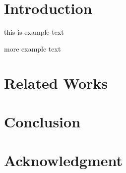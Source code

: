 \documentclass[conference]{IEEEtran}
\begin{document}
\section{Introduction}
this is example text
\par
more example text

\section{Related Works}






\section{Conclusion}


\section{Acknowledgment}


%
%
\end{document}
